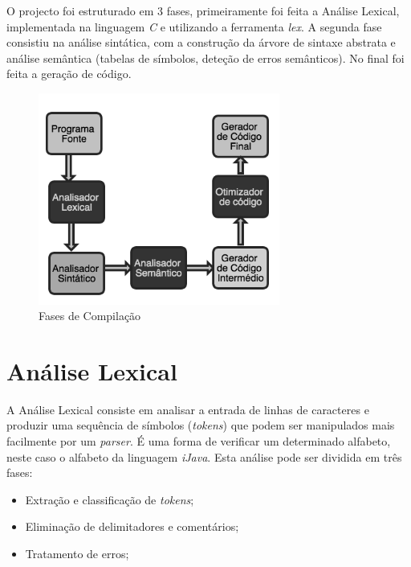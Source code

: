 \documentclass[12pt]{article}
\begin{document}
O projecto foi estruturado em 3 fases, primeiramente foi feita a Análise Lexical, implementada na linguagem \emph{C} e utilizando a ferramenta \emph{lex}. A segunda fase consistiu na análise sintática, com a  construção da árvore de sintaxe abstrata e análise semântica (tabelas de símbolos, deteção de erros semânticos). No final foi feita a geração de código.

\begin{figure}[H]
       \centering
       \includegraphics[keepaspectratio=true, width=300px]{fasesCompilacao.png}
       \caption{Fases de Compilação}
       \end{figure}


\section{Análise Lexical}

A Análise Lexical consiste em analisar a entrada de linhas de caracteres e produzir uma sequência de símbolos (\emph{tokens}) que podem ser manipulados mais facilmente por um \emph{parser}. É uma forma de verificar um determinado alfabeto, neste caso o alfabeto da linguagem \emph{iJava}.
Esta análise pode ser dividida em três fases:
\begin{itemize}
	\item Extração e classificação de \emph{tokens};
	\item Eliminação de delimitadores e comentários;
	\item Tratamento de erros;
\end{itemize}
\end{document}
